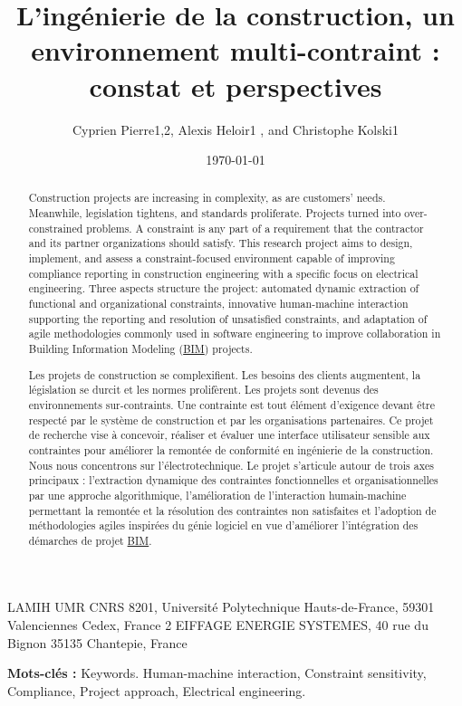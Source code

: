 \documentclass[a4paper,12pt]{article}
\author{Cyprien Pierre1,2, Alexis Heloir1 , and Christophe Kolski1}
\date{\today}
\title{L’ingénierie de la construction, un environnement multi-contraint : constat et perspectives}
\newenvironment{keyword}{\begin{trivlist}\item[]{\bfseries Mots-clés :}}{\end{trivlist}}
\begin{document}
 LAMIH UMR CNRS 8201, Université Polytechnique Hauts-de-France, 59301 Valenciennes Cedex, France
2 EIFFAGE ENERGIE SYSTEMES, 40 rue du Bignon 35135 Chantepie, France
\begin{otherlanguage}{english}
\begin{abstract}
Construction projects are increasing in complexity, as are customers’ needs. Meanwhile, legislation tightens, and standards proliferate. Projects turned into over-constrained problems. A constraint is any part of a requirement that the contractor and its partner organizations should satisfy. This research project aims to design, implement, and assess a constraint-focused environment capable of improving compliance reporting in construction engineering with a specific focus on electrical engineering. Three aspects structure the project: automated dynamic extraction of functional and organizational constraints, innovative human-machine interaction supporting the reporting and resolution of unsatisfied constraints, and adaptation of agile methodologies commonly used in software engineering to improve collaboration in Building Information Modeling
 (\protect\hyperlink{gls-1}{\label{gls-1-use-1}BIM}) projects.
\end{abstract}

\begin{keyword}
Keywords. Human-machine interaction, Constraint sensitivity, Compliance, Project approach, Electrical engineering.
\end{keyword}
\end{otherlanguage}

\begin{abstract}
Les projets de construction se complexifient. Les besoins des clients augmentent, la législation se durcit et les normes prolifèrent. Les projets sont devenus des environnements sur-contraints. Une contrainte est tout élément d’exigence devant être respecté par le système de construction et par les organisations partenaires. Ce projet de recherche vise à concevoir, réaliser et évaluer une interface utilisateur sensible aux contraintes pour améliorer la remontée de conformité en ingénierie de la construction. Nous nous concentrons sur l’électrotechnique. Le projet s'articule autour de trois axes principaux : l'extraction dynamique des contraintes fonctionnelles et organisationnelles par une approche algorithmique, l'amélioration de l'interaction humain-machine permettant la remontée et la résolution des contraintes non satisfaites et l'adoption de méthodologies agiles inspirées du génie logiciel en vue d’améliorer l’intégration des démarches de projet \protect\hyperlink{gls-1}{\label{gls-1-use-2}BIM}. 
\end{abstract}
\end{document}
